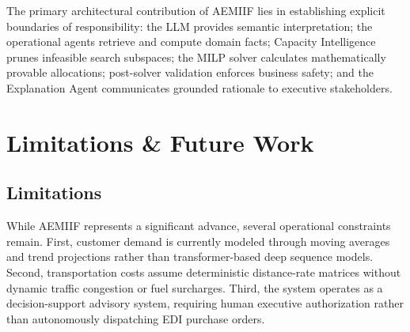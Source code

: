 \documentclass[conference]{IEEEtran}
\begin{document}
\begin{table}[htbp]
\centering
\caption{Comprehensive Architectural Capability Matrix}
\label{tab:arch_comparison}
\end{table}

The primary architectural contribution of AEMIIF lies in establishing explicit boundaries of responsibility: the LLM provides semantic interpretation; the operational agents retrieve and compute domain facts; Capacity Intelligence prunes infeasible search subspaces; the MILP solver calculates mathematically provable allocations; post-solver validation enforces business safety; and the Explanation Agent communicates grounded rationale to executive stakeholders.

\section{Limitations \& Future Work}
\subsection{Limitations}
While AEMIIF represents a significant advance, several operational constraints remain. First, customer demand is currently modeled through moving averages and trend projections rather than transformer-based deep sequence models. Second, transportation costs assume deterministic distance-rate matrices without dynamic traffic congestion or fuel surcharges. Third, the system operates as a decision-support advisory system, requiring human executive authorization rather than autonomously dispatching EDI purchase orders.
\end{document}
